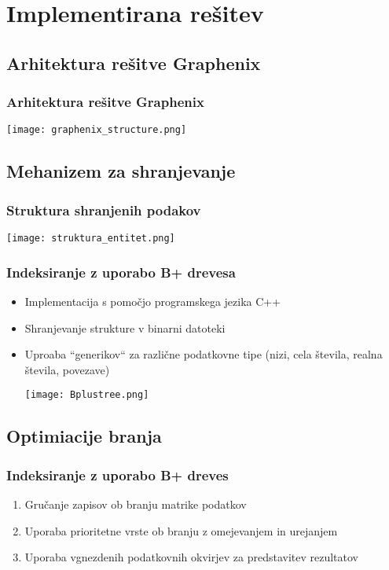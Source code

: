 \documentclass{beamer}
\begin{document}
\section{Implementirana rešitev}

    \subsection{Arhitektura rešitve Graphenix}
    \begin{frame}
    \frametitle{Arhitektura rešitve Graphenix}
        \centering
        \texttt{[image: graphenix\_structure.png]}
    \end{frame}

    \subsection{Mehanizem za shranjevanje}
    \begin{frame}
    \frametitle{Struktura shranjenih podakov}
        \centering
        \texttt{[image: struktura\_entitet.png]}
    \end{frame}

    \begin{frame}
    \frametitle{Indeksiranje z uporabo B+ drevesa}
    \begin{itemize}
        \item Implementacija s pomočjo programskega jezika C++
        \item Shranjevanje strukture v binarni datoteki
        \item Uproaba ``generikov`` za različne podatkovne tipe (nizi, cela števila, realna števila, povezave)
        
        \centering
        \texttt{[image: Bplustree.png]}
    \end{itemize}
    \end{frame}

    \subsection{Optimiacije branja}
    \frametitle{Indeksiranje z uporabo B+ dreves}
    \begin{frame}

    \begin{enumerate}
        \item Gručanje zapisov ob branju matrike podatkov
        \item Uporaba prioritetne vrste ob branju z omejevanjem in urejanjem
        \item Uporaba vgnezdenih podatkovnih okvirjev za predstavitev rezultatov
    \end{enumerate}
    \end{frame}
\end{document}
